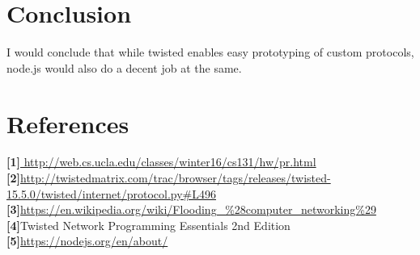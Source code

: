 \documentclass[letterpaper,twocolumn,10pt]{article}
\begin{document}
\section{Conclusion}

I would conclude that while twisted enables easy prototyping of custom protocols, node.js would also do a decent job at the same. 

\section{References}
\textbf{[1]}\url{ http://web.cs.ucla.edu/classes/winter16/cs131/hw/pr.html}\\
\textbf{[2]}\url{http://twistedmatrix.com/trac/browser/tags/releases/twisted-15.5.0/twisted/internet/protocol.py\#L496}\\
\textbf{[3]}\url{https://en.wikipedia.org/wiki/Flooding\_\%28computer\_networking\%29}\\
\textbf{[4]}Twisted Network Programming Essentials 2nd Edition\\
\textbf{[5]}\url{https://nodejs.org/en/about/}
\end{document}
